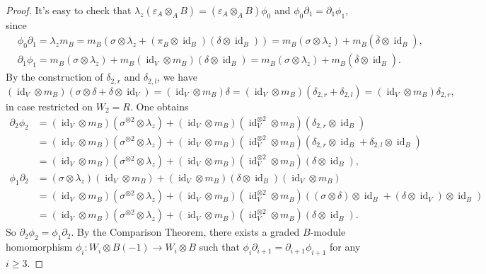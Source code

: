 \documentclass[a4paper,10pt]{amsart}
\theoremstyle{definition}
\numberwithin{equation}{section}
\DeclareMathOperator{\id}{id}
\begin{document}
\begin{proof}
It's easy to check that $\lambda_z(\varepsilon_A\otimes_A B)=(\varepsilon_A\otimes_AB)\phi_0$ and $\phi_0\partial_1=\partial_1\phi_1$, since
\begin{align*}
&\phi_0\partial_1=\lambda_zm_B=m_B(\sigma\otimes \lambda_z+(\pi_B\otimes\id_B)(\delta\otimes\id_B))=m_B(\sigma\otimes \lambda_z)+m_B(\overline{\delta}\otimes \id_B),\\
&\partial_1\phi_1=m_B(\sigma\otimes\lambda_z)+m_B(\id_V\otimes m_B)(\delta\otimes \id_B)=m_B(\sigma\otimes\lambda_z)+m_B(\overline{\delta}\otimes \id_B).
\end{align*}
By the construction of $\delta_{2,r}$ and $\delta_{2,l}$, we have
$$
(\id_V\otimes m_B)\left(\sigma\otimes\delta+\delta\otimes \id_V\right)=
(\id_V\otimes m_B)\delta=(\id_V\otimes m_B)(\delta_{2,r}+\delta_{2,l})=
(\id_V\otimes m_B)\delta_{2,r},
$$
in case restricted on $W_2=R$. One obtains
\begin{align*}
\partial_2\phi_2&=(\id_V\otimes m_B)(\sigma^{\otimes 2}\otimes \lambda_z)+(\id_V\otimes m_B)(\id_V^{\otimes2}\otimes m_B)(\delta_{2,r}\otimes \id_B)\\
&=(\id_V\otimes m_B)(\sigma^{\otimes 2}\otimes \lambda_z)+(\id_V\otimes m_B)(\id_V^{\otimes2}\otimes m_B)(\delta_{2,r}\otimes \id_B+\delta_{2,l}\otimes\id_B)\\
&=(\id_V\otimes m_B)(\sigma^{\otimes 2}\otimes \lambda_z)+(\id_V\otimes m_B)(\id_V^{\otimes2}\otimes m_B)(\delta \otimes\id_B),\\
\phi_1\partial_2&=(\sigma\otimes \lambda_z)(\id_V\otimes m_B)+(\id_V\otimes m_B)(\delta\otimes \id_B)(\id_V\otimes m_B)\\
&=(\id_V\otimes m_B)(\sigma^{\otimes 2}\otimes \lambda_z)+(\id_V\otimes m_B)(\id_V^{\otimes2}\otimes m_B)\left((\sigma\otimes\delta)\otimes\id_B+(\delta\otimes\id_V)\otimes \id_B\right)\\
&=(\id_V\otimes m_B)(\sigma^{\otimes 2}\otimes \lambda_z)+(\id_V\otimes m_B)(\id_V^{\otimes2}\otimes m_B)(\delta\otimes\id_B).
\end{align*}
So $\partial_2\phi_2=\phi_1\partial_2$. By the Comparison Theorem, there exists a graded $B$-module homomorphism $\phi_i: W_i\otimes B(-1)\to W_i\otimes B$ such that $\phi_i\partial_{i+1}=\partial_{i+1}\phi_{i+1}$  for any $i\geq 3$.



\end{proof}
\end{document}
